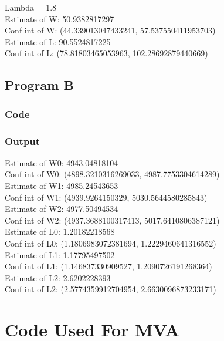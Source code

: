 \documentclass{article}
\begin{document}
				Lambda = 1.8\\
				Estimate of W: 50.9382817297\\
Conf int of W: (44.339013047433241, 57.537550411953703)\\

Estimate of L: 90.5524817225\\
Conf int of L: (78.81803465053963, 102.28692879440669)\\


  		
  		
  		\subsection{Program B}
  			\subsubsection{Code}
				
			\subsubsection{Output}
				Estimate of W0: 4943.04818104\\
Conf int of W0: (4898.3210316269033, 4987.7753304614289)\\

Estimate of W1: 4985.24543653\\
Conf int of W1: (4939.9264150329, 5030.5644580285843)\\

Estimate of W2: 4977.50494534\\
Conf int of W2: (4937.3688100317413, 5017.6410806387121)\\

Estimate of L0: 1.20182218568\\
Conf int of L0: (1.1806983072381694, 1.2229460641316552)\\

Estimate of L1: 1.17795497502\\
Conf int of L1: (1.146837330909527, 1.2090726191268364)\\

Estimate of L2: 2.6202228393\\
Conf int of L2: (2.5774359912704954, 2.6630096873233171)\\


	\section{Code Used For MVA}
		
\end{document}
